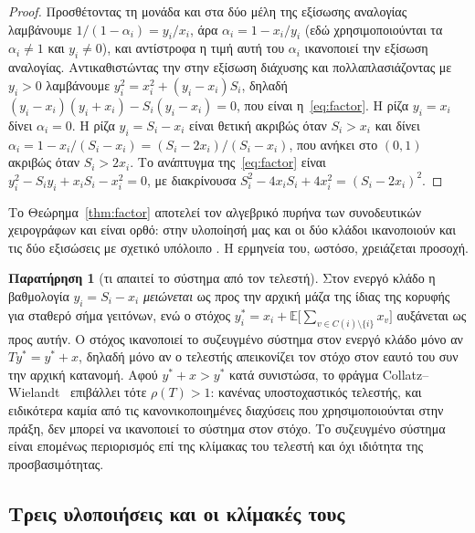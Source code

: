\documentclass[11pt,a4paper]{article}
\theoremstyle{definition}
\newtheorem{remark}{Παρατήρηση}
\theoremstyle{plain}
\newcommand{\E}{\mathbb{E}}
\begin{document}
\begin{proof}
Προσθέτοντας τη μονάδα και στα δύο μέλη της εξίσωσης αναλογίας λαμβάνουμε $1/(1-\alpha_i)=y_i/x_i$, άρα $\alpha_i=1-x_i/y_i$ (εδώ χρησιμοποιούνται τα $\alpha_i\ne1$ και $y_i\neq0$), και αντίστροφα η τιμή αυτή του $\alpha_i$ ικανοποιεί την εξίσωση αναλογίας. Αντικαθιστώντας την στην εξίσωση διάχυσης και πολλαπλασιάζοντας με $y_i>0$ λαμβάνουμε $y_i^2=x_i^2+(y_i-x_i)S_i$, δηλαδή $(y_i-x_i)(y_i+x_i)-S_i(y_i-x_i)=0$, που είναι η~\eqref{eq:factor}. Η ρίζα $y_i=x_i$ δίνει $\alpha_i=0$. Η ρίζα $y_i=S_i-x_i$ είναι θετική ακριβώς όταν $S_i>x_i$ και δίνει $\alpha_i=1-x_i/(S_i-x_i)=(S_i-2x_i)/(S_i-x_i)$, που ανήκει στο $(0,1)$ ακριβώς όταν $S_i>2x_i$. Το ανάπτυγμα της~\eqref{eq:factor} είναι $y_i^2-S_iy_i+x_iS_i-x_i^2=0$, με διακρίνουσα $S_i^2-4x_iS_i+4x_i^2=(S_i-2x_i)^2$.
\end{proof}

Το Θεώρημα~\ref{thm:factor} αποτελεί τον αλγεβρικό πυρήνα των συνοδευτικών χειρογράφων και είναι ορθό: στην υλοποίησή μας και οι δύο κλάδοι ικανοποιούν και τις δύο εξισώσεις με σχετικό υπόλοιπο \ThmResidual. Η ερμηνεία του, ωστόσο, χρειάζεται προσοχή.

\begin{remark}[τι απαιτεί το σύστημα από τον τελεστή]\label{rem:scale}
Στον ενεργό κλάδο η βαθμολογία $y_i=S_i-x_i$ \emph{μειώνεται} ως προς την αρχική μάζα της ίδιας της κορυφής για σταθερό σήμα γειτόνων, ενώ ο στόχος $y^*_i=x_i+\E\big[\sum_{v\in C(i)\setminus\{i\}}x_v\big]$ αυξάνεται ως προς αυτήν. Ο στόχος ικανοποιεί το συζευγμένο σύστημα στον ενεργό κλάδο μόνο αν $Ty^*=y^*+x$, δηλαδή μόνο αν ο τελεστής απεικονίζει τον στόχο στον εαυτό του συν την αρχική κατανομή. Αφού $y^*+x>y^*$ κατά συνιστώσα, το φράγμα Collatz--Wielandt~\cite{hornjohnson13} επιβάλλει τότε $\rho(T)>1$: κανένας υποστοχαστικός τελεστής, και ειδικότερα καμία από τις κανονικοποιημένες διαχύσεις που χρησιμοποιούνται στην πράξη, δεν μπορεί να ικανοποιεί το σύστημα στον στόχο. Το συζευγμένο σύστημα είναι επομένως περιορισμός επί της κλίμακας του τελεστή και όχι ιδιότητα της προσβασιμότητας.
\end{remark}

\subsection{Τρεις υλοποιήσεις και οι κλίμακές τους}\label{sec:realizations}
\end{document}
